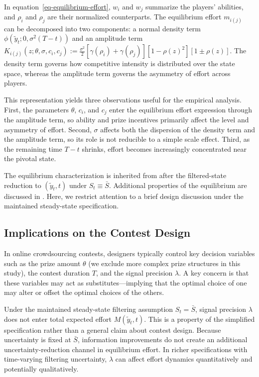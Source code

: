 \documentclass[mnsc]{informs3}
\begin{document}
In equation~\eqref{eq-equilibrium-effort}, $w_i$ and $w_j$ summarize the players' abilities, and $\rho_i$ and $\rho_j$ are their normalized counterparts.
The equilibrium effort $m_{i(j)}$ can be decomposed into two components: a normal density term $\phi(\tilde{y}_t; 0, \sigma^2(T-t))$ and an amplitude term $K_{i(j)}(z;\theta,\sigma,c_i,c_j)
:= \frac{\sigma^2}{2}\left[\gamma(\rho_i)+\gamma(\rho_j)\right]\left[1-\rho(z)^2\right]\left[1\pm\rho(z)\right]$.
The density term governs how competitive intensity is distributed over the state space, whereas the amplitude term governs the asymmetry of effort across players.

This representation yields three observations useful for the empirical analysis.
First, the parameters $\theta$, $c_i$, and $c_j$ enter the equilibrium effort expression through the amplitude term, so ability and prize incentives primarily affect the level and asymmetry of effort.
Second, $\sigma$ affects both the dispersion of the density term and the amplitude term, so its role is not reducible to a simple scale effect.
Third, as the remaining time $T-t$ shrinks, effort becomes increasingly concentrated near the pivotal state.

The equilibrium characterization is inherited from \citet{Ryvkin2022Fight} after the filtered-state reduction to $(\tilde y_t,t)$ under $S_t\equiv\bar S$.
Additional properties of the equilibrium are discussed in \citet{Ryvkin2022Fight}.
Here, we restrict attention to a brief design discussion under the maintained steady-state specification.



\subsection{Implications on the Contest Design}\label{sect-design}

In online crowdsourcing contests, designers typically control key decision variables such as the prize amount $\theta$ (we exclude more complex prize structures in this study), the contest duration $T$, and the signal precision $\lambda$.
A key concern is that these variables may act as substitutes—implying that the optimal choice of one may alter or offset the optimal choices of the others.

Under the maintained steady-state filtering assumption $S_t=\bar S$, signal precision $\lambda$ does not enter total expected effort $M(\tilde{y}_t,t)$.
This is a property of the simplified specification rather than a general claim about contest design.
Because uncertainty is fixed at $\bar S$, information improvements do not create an additional uncertainty-reduction channel in equilibrium effort.
In richer specifications with time-varying filtering uncertainty, $\lambda$ can affect effort dynamics quantitatively and potentially qualitatively.
\end{document}
